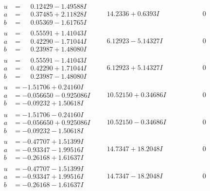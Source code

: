 \documentclass[1p]{elsarticle_modified}
\theoremstyle{definition}
\begin{document}
$$\begin{array}{c|c|c}
\begin{aligned}
u &= \phantom{-}0.12429 - 1.49588 I \\
a &= \phantom{-}0.37485 + 2.11828 I \\
b &= \phantom{-}0.05369 - 1.61765 I\end{aligned}
 & \phantom{-}14.2336 + 0.6393 I & \phantom{-0.000000 } 0 \\ \hline\begin{aligned}
u &= \phantom{-}0.55591 + 1.41043 I \\
a &= \phantom{-}0.42290 - 1.71044 I \\
b &= \phantom{-}0.23987 + 1.48080 I\end{aligned}
 & \phantom{-}6.12923 - 5.14327 I & \phantom{-0.000000 } 0 \\ \hline\begin{aligned}
u &= \phantom{-}0.55591 - 1.41043 I \\
a &= \phantom{-}0.42290 + 1.71044 I \\
b &= \phantom{-}0.23987 - 1.48080 I\end{aligned}
 & \phantom{-}6.12923 + 5.14327 I & \phantom{-0.000000 } 0 \\ \hline\begin{aligned}
u &= -1.51706 + 0.24160 I \\
a &= -0.056650 - 0.925086 I \\
b &= -0.09232 + 1.50618 I\end{aligned}
 & \phantom{-}10.52150 + 0.34686 I & \phantom{-0.000000 } 0 \\ \hline\begin{aligned}
u &= -1.51706 - 0.24160 I \\
a &= -0.056650 + 0.925086 I \\
b &= -0.09232 - 1.50618 I\end{aligned}
 & \phantom{-}10.52150 - 0.34686 I & \phantom{-0.000000 } 0 \\ \hline\begin{aligned}
u &= -0.47707 + 1.51399 I \\
a &= -0.93347 - 1.99516 I \\
b &= -0.26168 + 1.61637 I\end{aligned}
 & \phantom{-}14.7347 + 18.2048 I & \phantom{-0.000000 } 0 \\ \hline\begin{aligned}
u &= -0.47707 - 1.51399 I \\
a &= -0.93347 + 1.99516 I \\
b &= -0.26168 - 1.61637 I\end{aligned}
 & \phantom{-}14.7347 - 18.2048 I & \phantom{-0.000000 } 0\\

\end{array}$$
\end{document}
